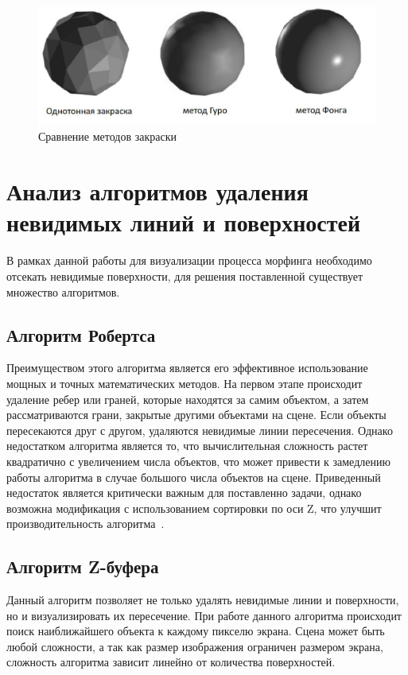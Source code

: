 \begin{figure}[H]
	\centering
	\includegraphics[scale=0.6]{images/shading_compare.jpg}
	\caption{Сравнение методов закраски}
	\label{fig:shading_compare}
\end{figure}


\section{Анализ алгоритмов удаления невидимых линий и поверхностей}

В рамках данной работы для визуализации процесса морфинга необходимо отсекать невидимые поверхности, для решения поставленной
существует множество алгоритмов.

\subsection{Алгоритм Робертса}
Преимуществом этого алгоритма является его эффективное использование мощных и точных математических методов. 
На первом этапе происходит удаление ребер или граней, которые находятся за самим объектом, а затем рассматриваются грани, закрытые другими объектами на сцене. 
Если объекты пересекаются друг с другом, удаляются невидимые линии пересечения. 
Однако недостатком алгоритма является то, что вычислительная сложность растет квадратично с увеличением числа объектов,
что может привести к замедлению работы алгоритма в случае большого числа объектов на сцене.
Приведенный недостаток является критически важным для поставленно задачи, однако возможна модификация с использованием 
сортировки по оси Z, что улучшит производительность алгоритма~\cite{Rodgers}.

\subsection{Алгоритм Z-буфера}
Данный алгоритм позволяет не только удалять невидимые линии и поверхности, но и визуализировать их пересечение.
При работе данного алгоритма происходит поиск наиближайшего объекта к каждому пикселю экрана.
Сцена может быть любой сложности, а так как размер изображения ограничен размером экрана, сложность алгоритма зависит линейно от количества поверхностей.

